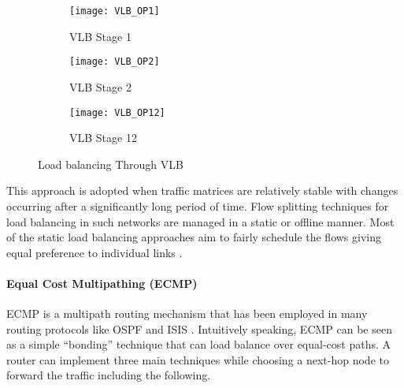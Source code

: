 \documentclass[10pt]{IEEEtran}
\begin{document}
\begin{figure*}
\centering
 \begin{subfigure}[ht!]{0.3\textwidth}
                \texttt{[image: VLB\_OP1]}
                \caption{VLB Stage 1}
                \label{fig:vlbs1}
        \end{subfigure}\begin{subfigure}[ht!]{0.33\textwidth}
                \texttt{[image: VLB\_OP2]}
                \caption{VLB Stage 2}
                \label{fig:vlbs2}
        \end{subfigure}
        \begin{subfigure}[ht!]{0.32\textwidth}
                \texttt{[image: VLB\_OP12]}
                \caption{VLB Stage 12}
                \label{fig:vlbs12}
        \end{subfigure}
        \caption{Load balancing Through VLB}\label{fig:vlb}

\end{figure*}

This approach is adopted when traffic matrices are relatively stable with changes occurring after a significantly long period of time. Flow splitting techniques for load balancing in such networks are managed in a static or offline manner. Most of the static load balancing approaches aim to fairly schedule the flows giving equal preference to individual links \cite{shreedhar1995efficient}.

 \vspace{2mm}
\paragraph{Equal Cost Multipathing (ECMP)}
\label{subsubsec:ecmp}

ECMP \cite{moy1998ospf, hopps2000multipath, hopps2000analysis} is a multipath routing mechanism that has been employed in many routing protocols like OSPF and ISIS \cite{villamizar1999ospf, fortz2000internet}. Intuitively speaking, ECMP can be seen as a simple ``bonding'' technique that can load balance over equal-cost paths. A router can implement three main techniques while choosing a next-hop node to forward the traffic including the following.
\end{document}
